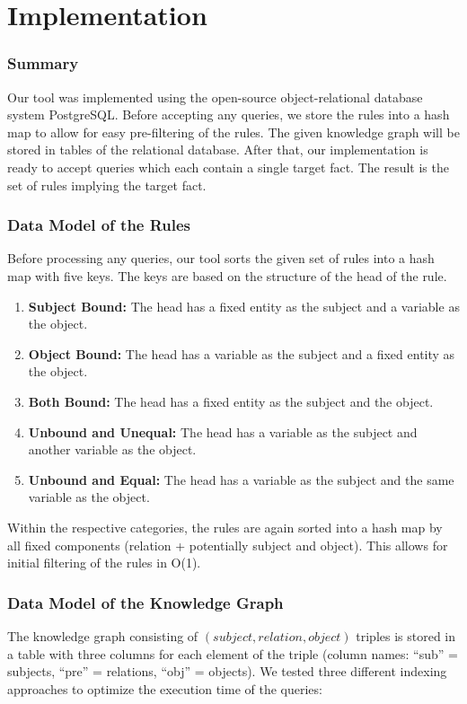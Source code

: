 \documentclass[runningheads]{llncs}
\begin{document}
\section{Implementation}

\subsubsection{Summary} 
Our tool was implemented using the open-source object-relational database system PostgreSQL. Before accepting any queries, we store the rules into a hash map to allow for easy pre-filtering of the rules. The given knowledge graph will be stored in tables of the relational database. After that, our implementation is ready to accept queries which each contain a single target fact. The result is the set of rules implying the target fact.

\subsubsection{Data Model of the Rules} 
Before processing any queries, our tool sorts the given set of rules into a hash map with five keys. The keys are based on the structure of the head of the rule.

\begin{enumerate}
  \item \textbf{Subject Bound:} The head has a fixed entity as the subject and a variable as the object.
  \item \textbf{Object Bound:} The head has a variable as the subject and a fixed entity as the object.
  \item \textbf{Both Bound:} The head has a fixed entity as the subject and the object.
  \item \textbf{Unbound and Unequal:} The head has a variable as the subject and another variable as the object.
  \item \textbf{Unbound and Equal:} The head has a variable as the subject and the same variable as the object.
\end{enumerate}

\noindent
Within the respective categories, the rules are again sorted into a hash map by all fixed components (relation + potentially subject and object). This allows for initial filtering of the rules in O(1).

\subsubsection{Data Model of the Knowledge Graph}
The knowledge graph consisting of \((subject, relation, object)\) triples is stored in a table with three columns for each element of the triple (column names: “sub” = subjects, “pre” = relations, “obj” = objects).
We tested three different indexing approaches to optimize the execution time of the queries:
\end{document}

